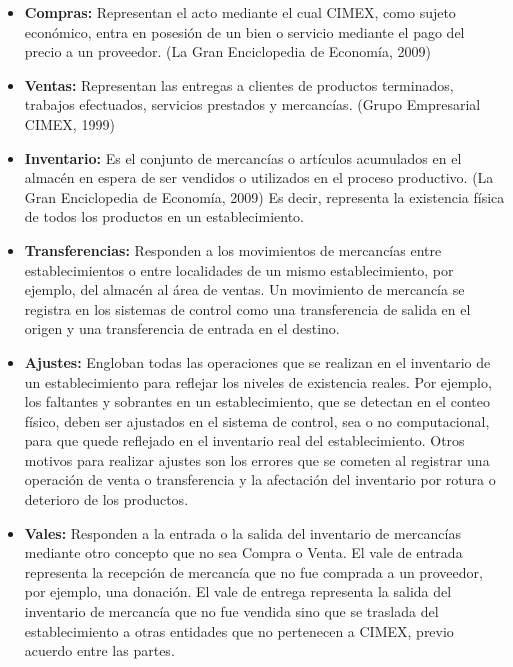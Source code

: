 \begin{itemize}
\item \textbf{Compras:} Representan el acto mediante el cual CIMEX, como sujeto económico, entra en posesión de un bien o servicio mediante el pago del precio a un proveedor. (La Gran Enciclopedia de Economía, 2009) 
\item \textbf{Ventas:} Representan las entregas a clientes de productos terminados, trabajos efectuados, servicios prestados y mercancías. (Grupo Empresarial CIMEX, 1999) 
\item \textbf{Inventario:} Es el conjunto de mercancías o artículos acumulados en el almacén en espera de ser vendidos o utilizados en el proceso productivo. (La Gran Enciclopedia de Economía, 2009) Es decir, representa la existencia física de todos los productos en un establecimiento. 
\item \textbf{Transferencias:} Responden a los movimientos de mercancías entre establecimientos o entre localidades de un mismo establecimiento, por ejemplo, del almacén al área de ventas. Un movimiento de mercancía se registra en los sistemas de control como una transferencia de salida en el origen y una transferencia de entrada en el destino.
\item \textbf{Ajustes:} Engloban todas las operaciones que se realizan en el inventario de un establecimiento para reflejar los niveles de existencia reales. Por ejemplo, los faltantes y sobrantes en un establecimiento, que se detectan en el conteo físico, deben ser ajustados en el sistema de control, sea o no computacional, para que quede reflejado en el inventario real del establecimiento. Otros motivos para realizar ajustes son los errores que se cometen al registrar una operación de venta o transferencia y la afectación del inventario por rotura o deterioro de los productos.
\item \textbf{Vales:} Responden a la entrada o la salida del inventario de mercancías mediante otro concepto que no sea Compra o Venta. El vale de entrada representa la recepción de mercancía que no fue comprada a un proveedor, por ejemplo, una donación. El vale de entrega representa la salida del inventario de mercancía que no fue vendida sino que se traslada del establecimiento a otras entidades que no pertenecen a CIMEX, previo acuerdo entre las partes. 
\end{itemize}  


